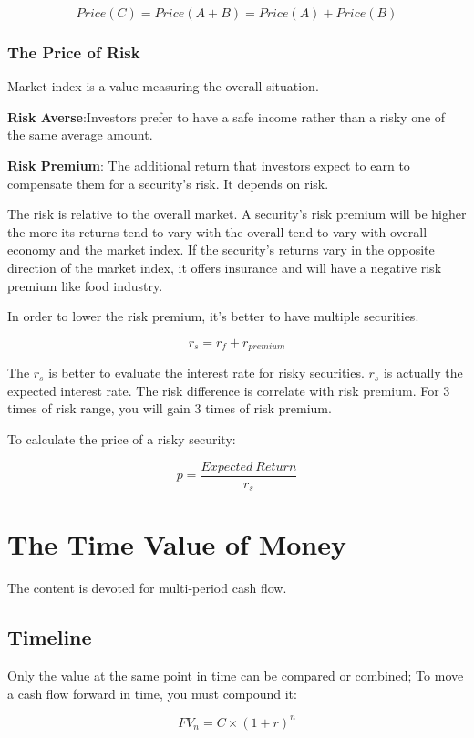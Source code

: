 \documentclass[10pt, a4paper]{article}
\begin{document}
                $$Price(C) = Price(A + B) = Price(A) + Price(B)$$

            \subsubsection{The Price of Risk}
                Market index is a value measuring the overall situation. 

                \textbf{Risk Averse}:Investors prefer  to  have a safe income rather than a risky one of the same average amount. 

                \textbf{Risk Premium}: The additional return that investors expect to earn to compensate them for a security's risk. It depends on risk. 

                The risk is relative to the overall market.  A security's risk premium will be higher the more its returns tend to vary with the overall tend to vary with overall economy and the market index. If the security's returns vary in the opposite direction of the market index, it offers insurance and will have a negative risk premium like food industry.  

                In order to lower the risk premium, it's better to have multiple securities. 

                $$r_s = r_f + r_{premium}$$

                The $r_s$ is better to evaluate the interest rate for risky securities. $r_s$ is actually the expected interest rate.  The risk difference is correlate with risk premium. For 3 times of risk range, you will gain 3 times of risk premium.

                To calculate the price of a risky security: 

                $$p = \frac{Expected\ Return}{r_s}$$
    \section{The Time Value of Money}
        The content is devoted for multi-period cash flow. 

        \subsection{Timeline}
            Only the value at the same point in time can be compared or combined; To move a cash flow forward in time, you must compound it: 

            $$FV_n = C \times (1 + r) ^ n$$
\end{document}
